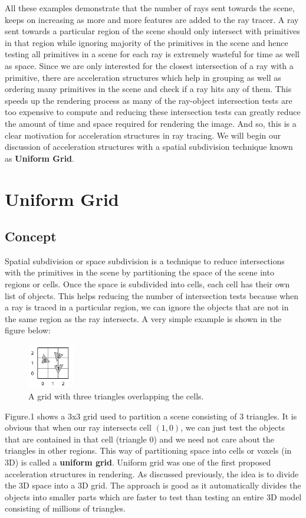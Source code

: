 \documentclass[11pt,a4paper]{article}
\begin{document}
All these examples demonstrate that the number of rays sent towards the scene, keeps on increasing as more and more features are added to the ray tracer. A ray sent towards a particular region of the scene should only intersect with primitives in that region while ignoring majority of the primitives in the scene and hence testing all primitives in a scene for each ray is extremely wasteful for time as well as space. Since we are only interested for the closest intersection of a ray with a primitive, there are acceleration structures which help in grouping as well as ordering many primitives in the scene and check if a ray hits any of them. This speeds up the rendering process as many of the ray-object intersection tests are too expensive to compute and reducing these intersection tests can greatly reduce the amount of time and space required for rendering the image. And so, this is a clear motivation for acceleration structures in ray tracing. We will begin our discussion of acceleration structures with a spatial subdivision technique known as \textbf{Uniform Grid}.

\section{Uniform Grid}
\subsection{Concept}
Spatial subdivision or space subdivision is a technique to reduce intersections with the primitives in the scene by partitioning the space of the scene into regions or cells. Once the space is subdivided into cells, each cell has their own list of objects. This helps reducing the number of intersection tests because when a ray is traced in a particular region, we can ignore the objects that are not in the same region as the ray intersects. A very simple example is shown in the figure below:
\begin{figure}[H]
	\centering
	\captionsetup{justification=centering,margin=2cm}
	\includegraphics[width=0.18\textwidth]{uniformgrids}
	\caption{A grid with three triangles overlapping the cells. \protect\cite{lagae2008compact}}
\end{figure}
Figure.1 shows a 3x3 grid used to partition a scene consisting of 3 triangles. It is obvious that when our ray intersects cell $(1, 0)$, we can just test the objects that are contained in that cell (triangle 0) and we need not care about the triangles in other regions. This way of partitioning space into cells or voxels (in 3D) is called a \textbf{uniform grid}.
Uniform grid was one of the first proposed acceleration structures \cite{fujimoto1986arts} in rendering. As discussed previously, the idea is to divide the 3D space into a 3D grid. The approach is good as it automatically divides the objects into smaller parts which are faster to test than testing an entire 3D model consisting of millions of triangles.
\end{document}
